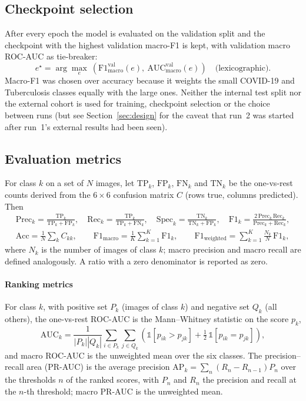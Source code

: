\subsection{Checkpoint selection}
After every epoch the model is evaluated on the validation split and the checkpoint with the highest validation macro-F1 is kept, with validation macro ROC-AUC as tie-breaker:
\begin{equation}
e^\star=\arg\max_{e}\ \left(\mathrm{F1}^{\text{val}}_{\text{macro}}(e),\ \mathrm{AUC}^{\text{val}}_{\text{macro}}(e)\right)\quad\text{(lexicographic)}.
\end{equation}
Macro-F1 was chosen over accuracy because it weights the small COVID-19 and Tuberculosis classes equally with the large ones. Neither the internal test split nor the external cohort is used for training, checkpoint selection or the choice between runs (but see Section~\ref{sec:design} for the caveat that run~2 was started after run~1's external results had been seen).

\subsection{Evaluation metrics}
\label{sec:metrics}
For class $k$ on a set of $N$ images, let $\mathrm{TP}_k$, $\mathrm{FP}_k$, $\mathrm{FN}_k$ and $\mathrm{TN}_k$ be the one-vs-rest counts derived from the $6\times6$ confusion matrix $C$ (rows true, columns predicted). Then
\begin{gather}
\mathrm{Prec}_k=\frac{\mathrm{TP}_k}{\mathrm{TP}_k+\mathrm{FP}_k},\quad
\mathrm{Rec}_k=\frac{\mathrm{TP}_k}{\mathrm{TP}_k+\mathrm{FN}_k},\quad
\mathrm{Spec}_k=\frac{\mathrm{TN}_k}{\mathrm{TN}_k+\mathrm{FP}_k},\quad
\mathrm{F1}_k=\frac{2\,\mathrm{Prec}_k\,\mathrm{Rec}_k}{\mathrm{Prec}_k+\mathrm{Rec}_k},\\
\mathrm{Acc}=\frac{1}{N}\sum_k C_{kk},\qquad
\mathrm{F1}_{\text{macro}}=\frac{1}{K}\sum_{k=1}^{K}\mathrm{F1}_k,\qquad
\mathrm{F1}_{\text{weighted}}=\sum_{k=1}^{K}\frac{N_k}{N}\,\mathrm{F1}_k ,
\end{gather}
where $N_k$ is the number of images of class $k$; macro precision and macro recall are defined analogously. A ratio with a zero denominator is reported as zero.

\paragraph{Ranking metrics} For class $k$, with positive set $P_k$ (images of class $k$) and negative set $Q_k$ (all others), the one-vs-rest ROC-AUC is the Mann--Whitney statistic on the score $p_k$,
\begin{equation}
\mathrm{AUC}_k=\frac{1}{|P_k||Q_k|}\sum_{i\in P_k}\sum_{j\in Q_k}\left(\mathbb{1}[p_{ik}>p_{jk}]+\tfrac12\,\mathbb{1}[p_{ik}=p_{jk}]\right),
\end{equation}
and macro ROC-AUC is the unweighted mean over the six classes. The precision--recall area (PR-AUC) is the average precision $\mathrm{AP}_k=\sum_n(R_n-R_{n-1})P_n$ over the thresholds $n$ of the ranked scores, with $P_n$ and $R_n$ the precision and recall at the $n$-th threshold; macro PR-AUC is the unweighted mean.

